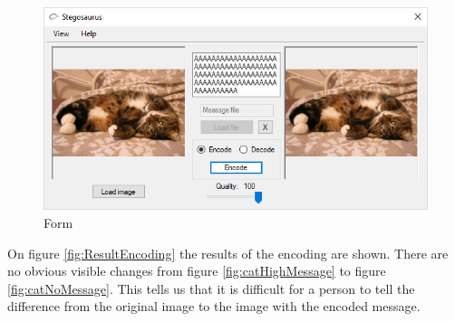 \begin{figure}
    \centering
    \includegraphics[width=.7\textwidth]{figures/formShown.png}
    \caption{Form}
    \label{fig:formApp}
\end{figure}

On figure \ref{fig:ResultEncoding} the results of the encoding are shown.
There are no obvious visible changes from figure \ref{fig:catHighMessage} to figure \ref{fig:catNoMessage}.
This tells us that it is difficult for a person to tell the difference from the original image to the image with the encoded message. 

